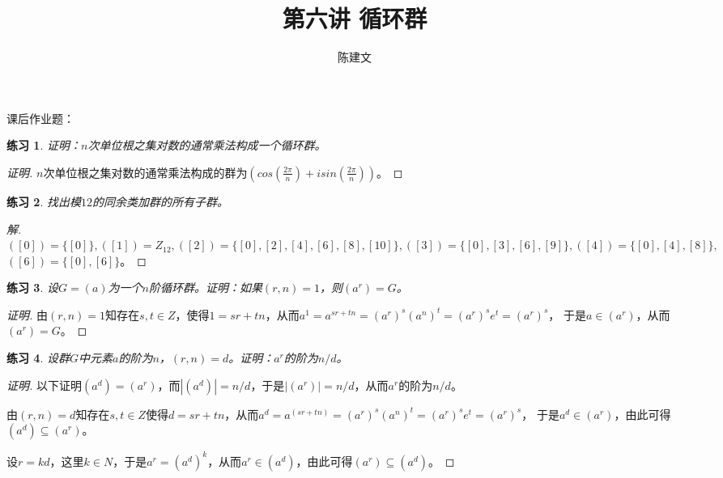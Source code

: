 \documentclass{article}
\newtheorem{Exercise}{练习}
\begin{document}
\begin{CJK*}{UTF8}{gbsn}
  \title{第六讲 循环群}
  \author{陈建文}
  \maketitle


课后作业题：
\begin{Exercise}
证明：$n$次单位根之集对数的通常乘法构成一个循环群。
\end{Exercise}
\begin{proof}[证明]
  $n$次单位根之集对数的通常乘法构成的群为$(cos(\frac{2\pi}{n})+isin(\frac{2\pi}{n}))$。
\end{proof}
\begin{Exercise}
找出模$12$的同余类加群的所有子群。
\end{Exercise}
\begin{proof}[解]
  $([0])=\{[0]\},([1])=Z_{12},([2])=\{[0],[2],[4],[6],[8],[10]\},([3])=\{[0],[3],[6],[9]\},([4])=\{[0],[4],[8]\},$
  $([6])=\{[0],[6]\}$。

\end{proof}
\begin{Exercise}
  设$G=(a)$为一个$n$阶循环群。证明：如果$(r,n)=1$，则$(a^r)=G$。
\end{Exercise}

\begin{proof}[证明]
  由$(r,n)=1$知存在$s,t\in Z$，使得$1=sr+tn$，从而$a^1=a^{sr+tn}=(a^r)^s(a^n)^t=(a^r)^se^t=(a^r)^s$，
  于是$a\in (a^r)$，从而$(a^r)=G$。
\end{proof}
\begin{Exercise}
  设群$G$中元素$a$的阶为$n$，$(r,n)=d$。证明：$a^r$的阶为$n/d$。
\end{Exercise}
\begin{proof}[证明]
  以下证明$(a^d)=(a^r)$，而$|(a^d)|=n/d$，于是$|(a^r)|=n/d$，从而$a^r$的阶为$n/d$。

  由$(r,n)=d$知存在$s,t\in Z$使得$d=sr+tn$，从而$a^d=a^{(sr+tn)}=(a^r)^s(a^n)^t=(a^r)^se^t=(a^r)^s$，
  于是$a^d\in (a^r)$，由此可得$(a^d)\subseteq (a^r)$。

  设$r=kd$，这里$k\in N$，于是$a^r=(a^d)^k$，从而$a^r\in (a^d)$，由此可得$(a^r)\subseteq (a^d)$。
\end{proof}
\end{CJK*}
\end{document}
